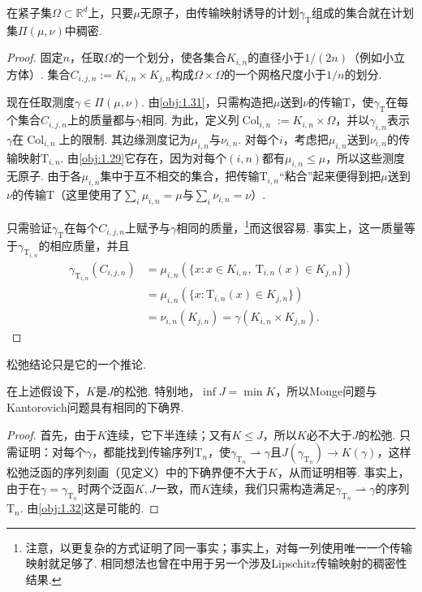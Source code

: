 \begin{theorem}\label{obj:1.32}
在紧子集$\Omega\subset\mathbb R^d$上，只要$\mu$无原子，由传输映射诱导的计划$\gamma_\mathrm{T}$组成的集合就在计划集$\Pi(\mu,\nu)$中稠密.
\end{theorem}
\begin{proof}
固定$n$，任取$\Omega$的一个划分，使各集合$K_{i,n}$的直径小于$1/(2n)$\mbox{（例如小立方体）.} 集合$C_{i,j,n}:=K_{i,n}\times K_{j,n}$构成$\Omega\times\Omega$的一个网格尺度小于$1/n$的划分.

现在任取测度$\gamma\in\Pi(\mu,\nu)$. 由\autoref{obj:1.31}，只需构造把$\mu$送到$\nu$的传输$\mathrm{T}$，使$\gamma_\mathrm{T}$在每个集合$C_{i,j,n}$上的质量都与$\gamma$相同. 为此，定义列$\operatorname{Col}_{i,n}:=K_{i,n}\times\Omega$，并以$\gamma_{i,n}$表示$\gamma$在$\operatorname{Col}_{i,n}$上的限制. 其边缘测度记为$\mu_{i,n}$与$\nu_{i,n}$. 对每个$i$，考虑把$\mu_{i,n}$送到$\nu_{i,n}$的传输映射$\mathrm{T}_{i,n}$. 由\autoref{obj:1.29}它存在，因为对每个$(i,n)$都有$\mu_{i,n}\le\mu$，所以这些测度无原子. 由于各$\mu_{i,n}$集中于互不相交的集合，把传输$\mathrm{T}_{i,n}$“粘合”起来便得到把$\mu$送到$\nu$的传输$\mathrm{T}$（这里使用了$\sum_i\mu_{i,n}=\mu$与$\sum_i\nu_{i,n}=\nu$）.

只需验证$\gamma_\mathrm{T}$在每个$C_{i,j,n}$上赋予与$\gamma$相同的质量，\footnote{注意，\cite{b8,b253}以更复杂的方式证明了同一事实；事实上，对每一列使用唯一一个传输映射就足够了. 相同想法也曾在\cite{b146}中用于另一个涉及Lipschitz传输映射的稠密性结果.}而这很容易. 事实上，这一质量等于$\gamma_{\mathrm{T}_{i,n}}$的相应质量，并且
\begin{equation*}
\begin{aligned}
\gamma_{\mathrm{T}_{i,n}}(C_{i,j,n})
&=\mu_{i,n}(\{x:x\in K_{i,n},\ \mathrm{T}_{i,n}(x)\in K_{j,n}\})\\
&=\mu_{i,n}(\{x:\mathrm{T}_{i,n}(x)\in K_{j,n}\})\\
&=\nu_{i,n}(K_{j,n})=\gamma(K_{i,n}\times K_{j,n}).
\end{aligned}
\end{equation*}
\end{proof}

松弛结论只是它的一个推论.

\begin{theorem}\label{obj:1.33}
在上述假设下，$K$是$J$的松弛. 特别地，$\inf J=\min K$，所以Monge问题与Kantorovich问题具有相同的下确界.
\end{theorem}
\begin{proof}
首先，由于$K$连续，它下半连续；又有$K\le J$，所以$K$必不大于$J$的松弛. 只需证明：对每个$\gamma$，都能找到传输序列$\mathrm{T}_n$，使$\gamma_{\mathrm{T}_n}\rightharpoonup\gamma$且$J(\gamma_{\mathrm{T}_n})\to K(\gamma)$，这样松弛泛函的序列刻画（见定义）中的下确界便不大于$K$，从而证明相等. 事实上，由于在$\gamma=\gamma_{\mathrm{T}_n}$时两个泛函$K,J$一致，而$K$连续，我们只需构造满足$\gamma_{\mathrm{T}_n}\rightharpoonup\gamma$的序列$\mathrm{T}_n$. 由\autoref{obj:1.32}这是可能的.
\end{proof}
